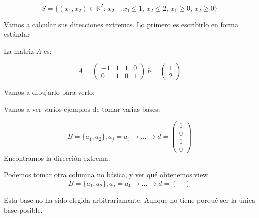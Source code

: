 \begin{example}

\[S = \{(x_1,x_2)\in\mathbb{R}^2:\, x_2-x_1\leq 1,\, x_2\leq 2,\, x_1\geq 0,\, x_2\geq 0\}\]

Vamos a calcular sus direcciones extremas. Lo primero es escribirlo en forma estándar

\begin{ioprob} 
\end{ioprob}

La matriz $A$ es:

\[A = \begin{pmatrix}-1&1&1&0\\0&1&0&1\end{pmatrix}\; b = \begin{pmatrix}1\\2\end{pmatrix}\]

Vamos a dibujarlo para verlo:

\begin{figure}[h]
\centering
{}
\end{figure}


Vamos a ver varios ejemplos de tomar varias bases:

\[
B = \{a_1,a_2\}, a_j = a_3 \to ... \to d = \begin{pmatrix}1\\0\\\hline1\\0\end{pmatrix}
\]
Encontramos la dirección extrema.

Podemos tomar otra columna no básica, y ver qué obtenemos:view
\[
B = \{a_1,a_2\}, a_j = a_4 \to ... \to d = \begin{pmatrix}\vdots\end{pmatrix}
\]

Esta base no ha sido elegida arbitrariamente. Aunque no tiene porqué ser la única base posible.
\end{example}

